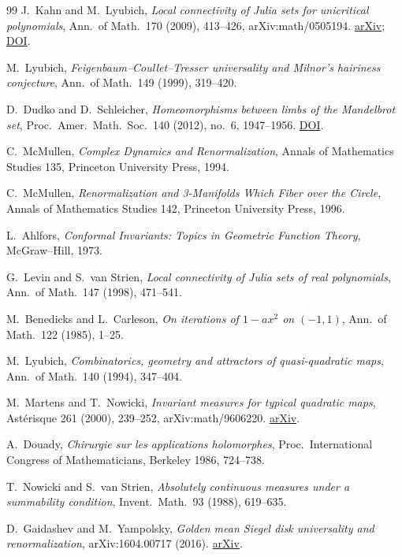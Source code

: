 \documentclass[11pt,a4paper,oneside,openany]{book}
\theoremstyle{definition}
\theoremstyle{remark}
\begin{document}
\begin{thebibliography}{99}
J.~Kahn and M.~Lyubich,
\emph{Local connectivity of Julia sets for unicritical polynomials}, Ann.\ of Math.\ 170 (2009), 413--426, arXiv:math/0505194.
\href{https://arxiv.org/abs/math/0505194}{arXiv};
\href{https://doi.org/10.4007/annals.2009.170.413}{DOI}.

M.~Lyubich,
\emph{Feigenbaum--Coullet--Tresser universality and Milnor's hairiness conjecture}, Ann.\ of Math.\ 149 (1999), 319--420.

D.~Dudko and D.~Schleicher,
\emph{Homeomorphisms between limbs of the Mandelbrot set}, Proc.\ Amer.\ Math.\ Soc.\ 140 (2012), no.~6, 1947--1956.
\href{https://doi.org/10.1090/S0002-9939-2011-11047-5}{DOI}.

C.~McMullen,
\emph{Complex Dynamics and Renormalization}, Annals of Mathematics Studies 135, Princeton University Press, 1994.

C.~McMullen,
\emph{Renormalization and 3-Manifolds Which Fiber over the Circle}, Annals of Mathematics Studies 142, Princeton University Press, 1996.

L.~Ahlfors,
\emph{Conformal Invariants: Topics in Geometric Function Theory}, McGraw--Hill, 1973.

G.~Levin and S.~van Strien,
\emph{Local connectivity of Julia sets of real polynomials}, Ann.\ of Math.\ 147 (1998), 471--541.

M.~Benedicks and L.~Carleson,
\emph{On iterations of $1-ax^2$ on $(-1,1)$}, Ann.\ of Math.\ 122 (1985), 1--25.

M.~Lyubich,
\emph{Combinatorics, geometry and attractors of quasi-quadratic maps}, Ann.\ of Math.\ 140 (1994), 347--404.

M.~Martens and T.~Nowicki,
\emph{Invariant measures for typical quadratic maps}, Ast\'erisque 261 (2000), 239--252, arXiv:math/9606220.
\href{https://arxiv.org/abs/math/9606220}{arXiv}.

A.~Douady,
\emph{Chirurgie sur les applications holomorphes}, Proc.\ International Congress of Mathematicians, Berkeley 1986, 724--738.

T.~Nowicki and S.~van Strien,
\emph{Absolutely continuous measures under a summability condition}, Invent.\ Math.\ 93 (1988), 619--635.

D.~Gaidashev and M.~Yampolsky,
\emph{Golden mean Siegel disk universality and renormalization}, arXiv:1604.00717 (2016).
\href{https://arxiv.org/abs/1604.00717}{arXiv}.


\end{thebibliography}
\end{document}
